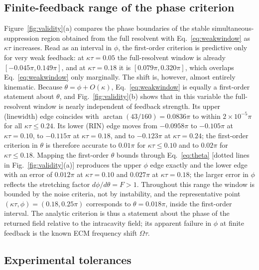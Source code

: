 \documentclass{optica-article}
\newif\ifmarked
\newenvironment{revised}{\ifmarked\color{blue}\fi}{}
\begin{document}
\begin{revised}
\subsection{Finite-feedback range of the phase criterion}
\label{sec:range}

Figure~\ref{fig:validity}(a) compares the phase boundaries of the stable simultaneous-suppression region obtained from the full resolvent with Eq.~\eqref{eq:weakwindow} as $\kappa\tau$ increases. Read as an interval in $\phi$, the first-order criterion is predictive only for very weak feedback: at $\kappa\tau=0.05$ the full-resolvent window is already $[-0.045\pi,0.149\pi]$, and at $\kappa\tau=0.18$ it is $[0.079\pi,0.320\pi]$, which overlaps Eq.~\eqref{eq:weakwindow} only marginally. The shift is, however, almost entirely kinematic. Because $\theta=\phi+O(\kappa)$, Eq.~\eqref{eq:weakwindow} is equally a first-order statement about $\theta$, and Fig.~\ref{fig:validity}(b) shows that in this variable the full-resolvent window is nearly independent of feedback strength. Its upper (linewidth) edge coincides with $\arctan(43/160)=0.0836\pi$ to within $2\times10^{-5}\pi$ for all $\kappa\tau\le0.24$. Its lower (RIN) edge moves from $-0.0958\pi$ to $-0.105\pi$ at $\kappa\tau=0.10$, to $-0.115\pi$ at $\kappa\tau=0.18$, and to $-0.123\pi$ at $\kappa\tau=0.24$; the first-order criterion in $\theta$ is therefore accurate to $0.01\pi$ for $\kappa\tau\le0.10$ and to $0.02\pi$ for $\kappa\tau\le0.18$. Mapping the first-order $\theta$ bounds through Eq.~\eqref{eq:theta} [dotted lines in Fig.~\ref{fig:validity}(a)] reproduces the upper $\phi$ edge exactly and the lower edge with an error of $0.012\pi$ at $\kappa\tau=0.10$ and $0.027\pi$ at $\kappa\tau=0.18$; the larger error in $\phi$ reflects the stretching factor $d\phi/d\theta=F>1$. Throughout this range the window is bounded by the noise criteria, not by instability, and the representative point $(\kappa\tau,\phi)=(0.18,0.25\pi)$ corresponds to $\theta=0.018\pi$, inside the first-order interval. The analytic criterion is thus a statement about the phase of the returned field relative to the intracavity field; its apparent failure in $\phi$ at finite feedback is the known ECM frequency shift $\Omega\tau$.

\subsection{Experimental tolerances}
\label{sec:tolerance}


\end{revised}
\end{document}
